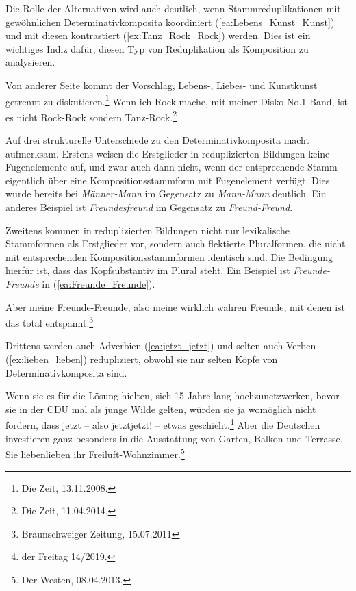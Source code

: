 Die Rolle der Alternativen wird auch deutlich, wenn Stammreduplikationen mit gewöhnlichen Determinativkomposita koordiniert (\ref{ea:Lebens_Kunst_Kunst}) und mit diesen kontrastiert (\ref{ex:Tanz_Rock_Rock}) werden. Dies ist ein wichtiges Indiz dafür, diesen Typ von Reduplikation als Komposition zu analysieren.

\ea \label{ea:DetKomp_ReplKomp}
\ea \label{ea:Lebens_Kunst_Kunst} Von anderer Seite kommt der Vorschlag, Lebens-, Liebes- und Kunstkunst getrennt zu diskutieren.\footnote{Die Zeit, 13.11.2008.}
\ex \label{ex:Tanz_Rock_Rock} Wenn ich Rock mache, mit meiner Disko-No.1-Band, ist es nicht Rock-Rock sondern Tanz-Rock.\footnote{ Die Zeit, 11.04.2014.}
\z 
\z 

Auf drei strukturelle Unterschiede zu den Determinativkomposita macht \citet[924--926]{Freywald2015} aufmerksam. Erstens weisen die Erstglieder in reduplizierten Bildungen keine Fugenelemente auf, und zwar auch dann nicht, wenn der entsprechende Stamm eigentlich über eine Kompositionsstammform mit Fugenelement verfügt. Dies wurde bereits bei \textit{Männer-Mann} im Gegensatz zu \textit{Mann-Mann} deutlich. Ein anderes Beispiel ist \textit{Freundesfreund} im Gegensatz zu \textit{Freund-Freund}. 

Zweitens kommen in reduplizierten Bildungen nicht nur lexikalische Stammformen als Erstglieder vor, sondern auch flektierte Pluralformen, die nicht mit entsprechenden Kompositionsstammformen identisch sind. Die Bedingung hierfür ist, dass das Kopfsubstantiv im Plural steht. Ein Beispiel ist \textit{Freunde-Freunde} in (\ref{ea:Freunde_Freunde}).

\ea \label{ea:Freunde_Freunde} Aber meine Freunde-Freunde, also meine wirklich wahren Freunde, mit denen ist das total entspannt.\footnote{Braunschweiger Zeitung, 15.07.2011}
\z 

Drittens werden auch Adverbien (\ref{ea:jetzt_jetzt}) und selten auch Verben (\ref{ex:lieben_lieben}) redupliziert, obwohl sie nur selten Köpfe von Determinativkomposita sind.

\ea \label{ea:Adv_V_Redupl}
\ea \label{ea:jetzt_jetzt} Wenn sie es für die Lösung hielten, sich 15 Jahre lang hochzunetzwerken, bevor sie in der CDU mal als junge Wilde gelten, würden sie ja womöglich nicht fordern, dass jetzt -- also jetztjetzt! -- etwas geschieht.\footnote{der Freitag 14/2019.}
\ex \label{ex:lieben_lieben} Aber die Deutschen investieren ganz besonders in die Ausstattung von Garten, Balkon und Terrasse. Sie liebenlieben ihr Freiluft-Wohnzimmer.\footnote{Der Westen, 08.04.2013.}
\z 
\z 

